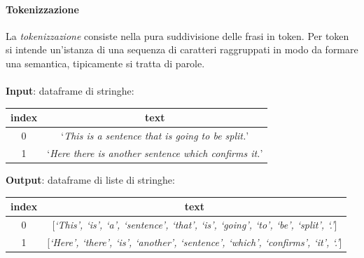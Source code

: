 \documentclass[12pt]{report}
\theoremstyle{definition}
\begin{document}
\paragraph{Tokenizzazione}
La \textit{tokenizzazione} consiste nella pura suddivisione delle frasi in token. Per token si intende un'istanza di una sequenza di caratteri raggruppati in modo da formare una semantica, tipicamente si tratta di parole.
\\
\\
\textbf{Input}: dataframe di stringhe:
\begin{center}
    \begin{tabular}{|c|c|}
    \hline
    \textbf{index} & \textbf{text} \\
    \hline
         0 & `\textit{This is a sentence that is going to be split.}'\\
         1 & `\textit{Here there is another sentence which confirms it.}'\\
    \hline
    \end{tabular}
\end{center}
\textbf{Output}: dataframe di liste di stringhe:
\begin{center}
    \begin{tabular}{|c|c|}
    \hline
    \textbf{index} & \textbf{text} \\
    \hline
         0 & [\textit{`This', `is', `a', `sentence', `that', `is', `going', `to', `be', `split', `.'}]\\
         1 & [\textit{`Here', `there', `is', `another', `sentence', `which', `confirms', `it', `.'}]\\
    \hline
    \end{tabular}
\end{center}
\end{document}
